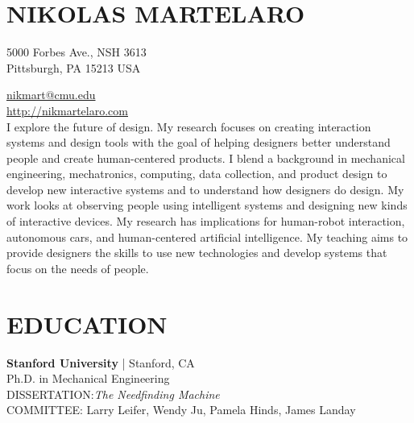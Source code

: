 \documentclass[11pt]{article} %
\begin{document}

\section*{NIKOLAS MARTELARO}

5000 Forbes Ave., NSH 3613 \\ 
Pittsburgh, PA 15213 USA


\href{mailto:nikmart@cmu.edu}{nikmart@cmu.edu}\\ %
\href{http://nikmartelaro.com}{http://nikmartelaro.com}\\ %
\bigskip\bigskip %
I explore the future of design. 
My research focuses on creating interaction systems and design tools with the goal of helping designers better understand people and create human-centered products.
I blend a background in mechanical engineering, mechatronics, computing, data collection, and product design to develop new interactive systems and to understand how designers do design. 
My work looks at observing people using intelligent systems and designing new kinds of interactive devices. 
My research has implications for human-robot interaction, autonomous cars, and human-centered artificial intelligence. 
My teaching aims to provide designers the skills to use new technologies and develop systems that focus on the needs of people.

\section*{EDUCATION}

\textbf{Stanford University} | Stanford, CA\\
Ph.D. in Mechanical Engineering\\
DISSERTATION:\emph{The Needfinding Machine}\\
COMMITTEE: Larry Leifer, Wendy Ju, Pamela Hinds, James Landay
\medskip 
\end{document}
